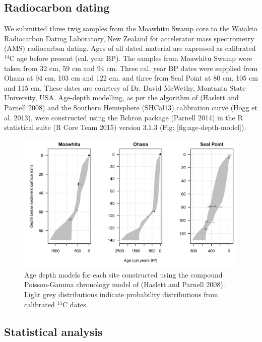 \subsection{Radiocarbon dating}\label{radiocarbon-dating}

We submitted three twig samples from the Moawhitu Swamp core to the
Waiakto Radiocarbon Dating Laboratory, New Zealand for accelerator mass
spectrometry (AMS) radiocarbon dating. Ages of all dated material are
expressed as calibrated \(^{14}\)C age before present (cal. year BP).
The samples from Moawhitu Swamp were taken from 32 cm, 59 cm and 94 cm.
Three cal. year BP dates were supplied from Ohana at 94 cm, 103 cm and
122 cm, and three from Seal Point at 80 cm, 105 cm and 115 cm. These
dates are courtesy of Dr. David McWethy, Montanta State University, USA.
Age-depth modelling, as per the algorithm of (Haslett and Parnell 2008)
and the Southern Hemisphere (SHCal13) calibration curve (Hogg et al.
2013), were constructed using the Bchron package (Parnell 2014) in the R
statistical suite (R Core Team 2015) version 3.1.3 (Fig:
{[}fig:age-depth-model{]}).

\begin{figure}
\centering
\includegraphics{Figs/age-depth-models/age-depth-model-all.png}
\caption{Age depth models for each site constructed using the compound
Poisson-Gamma chronology model of (Haslett and Parnell 2008). Light grey
distributions indicate probability distributions from calibrated
\(^{14}\)C dates.{}}
\end{figure}

\subsection{Statistical analysis}\label{statistical-analysis}


